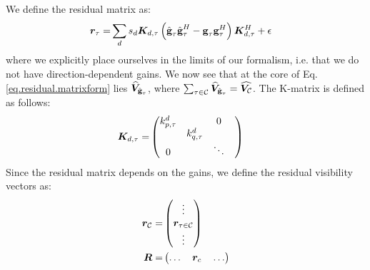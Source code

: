 \pg
We define the residual matrix as:
\begin{align}
\bm{r}_{\tau} =& \sum_d s_d \bm{K}_{d,\tau} \left( \hat{\textbf{g}}_\tau\hat{\textbf{g}}_\tau^H - \textbf{g}_\tau\textbf{g}_\tau^H \right) \bm{K}_{d,\tau}^H + \epsilon \label{eq.residual.matrixform}
\end{align}
where we {explicitly place ourselves in the limits of our formalism, i.e.} that we do not have direction-dependent gains. We now see that at the core of Eq. \ref{eq.residual.matrixform} lies $\displaystyle\widehat{\bm{V}}_{\hat{\textbf{g}}_\tau}$, where $\sum_{\tau\in\mathcal{C}} \widehat{\bm{V}}_{\hat{\textbf{g}}_\tau} = \widehat{\bm{V}_{\mathcal{C}}}$.
The K-matrix is defined as follows:
\begin{align}\label{kmat.def}
\bm{K}_{d,\tau} =&
\begin{pmatrix}
k_{p,\tau}^{d}   &                       &   0     &\\
                       & k_{q,\tau}^{d}  &        &\\ 
         0              &                       & \ddots 
\end{pmatrix}
\end{align}
Since the residual matrix depends on the gains, we define the residual visibility vectors as:
\begin{align}
\bm{r}_{{\mathcal{C}}} =&   \begin{pmatrix} \vdots \\ \bm{r}_{\tau\in \mathcal{C}} \\ \vdots \end{pmatrix} \\
\bm{R} =&   \begin{pmatrix} \hdots \quad \bm{r}_{c} \quad \hdots \end{pmatrix}
\end{align}

